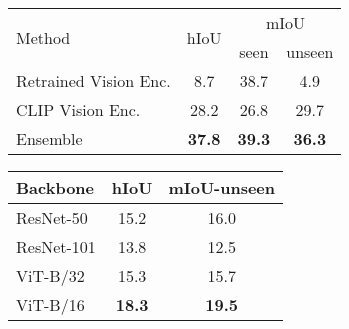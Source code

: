 \documentclass[runningheads]{llncs}
\makeatletter
\newcommand\tabcaption{\def\@captype{table}\caption}
\makeatother
\begin{document}
\begin{figtab}
\footnotesize
  \begin{minipage}[t]{0.48\linewidth}
    \centering
    \tabcaption{Study of different region classification methods on COCO Stuff dataset.}
    \vspace{1em}
    \begin{tabular}{l|c|c|c}
    \toprule
      \multirow{2}{*}{Method} & \multirow{2}{*}{hIoU} & \multicolumn{2}{c}{mIoU}\\
      \cline{3-4}
      && seen & unseen\\
      \hline
      Retrained Vision Enc.  &8.7 &38.7&4.9  \\
      CLIP Vision Enc. &28.2 &26.8&29.7 \\
      Ensemble &\textbf{37.8}&\textbf{39.3}&\textbf{36.3} \\
    \bottomrule
    \end{tabular}
    \label{tab:aba_classifier}    
    
  \end{minipage}\quad
  \begin{minipage}[t]{0.48\linewidth}
    \centering
    \tabcaption{Evaluate the performance of different CLIP variants in our framework on COCO Stuff dataset with manual prompt.}
    \vspace{1em}
    \begin{tabular}{l|c|c}
    \toprule
      Backbone&hIoU  & mIoU-unseen\\
      \hline
      ResNet-50&15.2&16.0\\
      ResNet-101&13.8&12.5\\
      ViT-B/32&15.3&15.7\\
      ViT-B/16&\textbf{18.3} &\textbf{19.5}\\
    \bottomrule
    \end{tabular}
    \label{tab:clip_backbone}
  \end{minipage}
  \vspace{-2em}   
\end{figtab}
\end{document}
